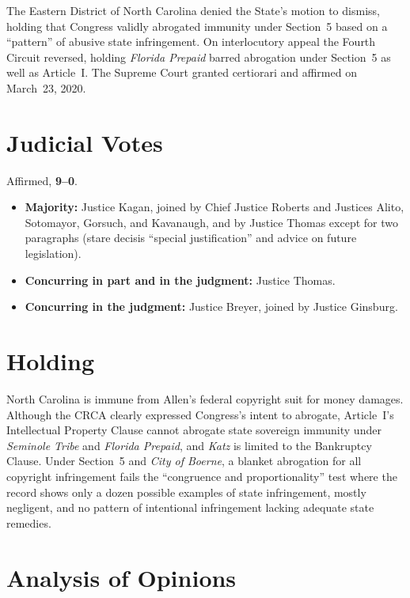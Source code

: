 \documentclass[12pt]{article}
\begin{document}
The Eastern District of North Carolina denied the State's motion to dismiss, holding that Congress validly abrogated immunity under Section~5 based on a ``pattern'' of abusive state infringement. On interlocutory appeal the Fourth Circuit reversed, holding \textit{Florida Prepaid} barred abrogation under Section~5 as well as Article~I. The Supreme Court granted certiorari and affirmed on March~23, 2020.

\section{Judicial Votes}

Affirmed, \textbf{9--0}.
\begin{itemize}
\item \textbf{Majority:} Justice Kagan, joined by Chief Justice Roberts and Justices Alito, Sotomayor, Gorsuch, and Kavanaugh, and by Justice Thomas except for two paragraphs (stare decisis ``special justification'' and advice on future legislation).
\item \textbf{Concurring in part and in the judgment:} Justice Thomas.
\item \textbf{Concurring in the judgment:} Justice Breyer, joined by Justice Ginsburg.
\end{itemize}

\section{Holding}

North Carolina is immune from Allen's federal copyright suit for money damages. Although the CRCA clearly expressed Congress's intent to abrogate, Article~I's Intellectual Property Clause cannot abrogate state sovereign immunity under \textit{Seminole Tribe} and \textit{Florida Prepaid}, and \textit{Katz} is limited to the Bankruptcy Clause. Under Section~5 and \textit{City of Boerne}, a blanket abrogation for all copyright infringement fails the ``congruence and proportionality'' test where the record shows only a dozen possible examples of state infringement, mostly negligent, and no pattern of intentional infringement lacking adequate state remedies.

\section{Analysis of Opinions}
\end{document}
